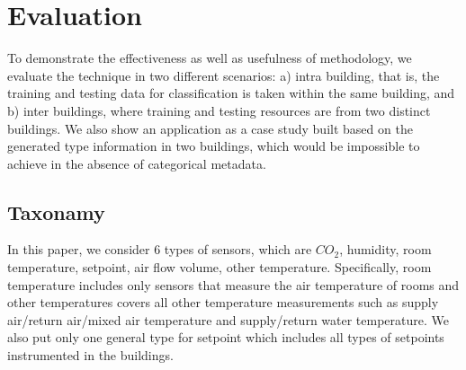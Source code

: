
\section{Evaluation}
To demonstrate the effectiveness as well as usefulness of methodology, we evaluate the technique in two different scenarios: a) intra building, that is, the training and testing data for classification is taken within the same building, and b) inter buildings, where training and testing resources are from two distinct buildings. We also show an application as a case study built based on the generated type information in two buildings, which would be impossible to achieve in the absence of categorical metadata. 

\subsection{Taxonamy}
In this paper, we consider 6 types of sensors, which are $CO_{2}$, humidity, room temperature, setpoint, air flow volume, other temperature. Specifically, room temperature includes only sensors that measure the air temperature of rooms and other temperatures covers all other temperature measurements such as supply air/return air/mixed air temperature and supply/return water temperature. We also put only one general type for setpoint which includes all types of setpoints instrumented in the buildings.

